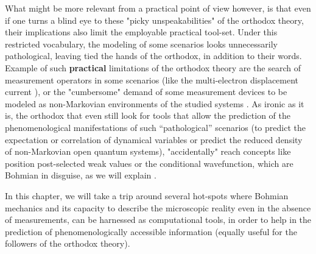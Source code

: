 \documentclass[11pt, a4paper]{article} %
\begin{document}
What might be more relevant from a practical point of view however, is that even if one turns a blind eye to these "picky unspeakabilities" of the orthodox theory, their implications also limit the employable practical tool-set. Under this restricted vocabulary, the modeling of some scenarios looks unnecessarily pathological, leaving tied the hands of the orthodox, in addition to their words. Example of such {\bf practical} limitations of the orthodox theory are the search of measurement operators in some scenarios (like the multi-electron displacement current \cite{equiv, Pel}), or the "cumbersome" demand of some measurement devices to be modeled as non-Markovian environments of the studied systems \cite{Thz}. As ironic as it is, the orthodox that even still look for tools that allow the prediction of the phenomenological manifestations of such “pathological” scenarios (to predict the expectation or correlation of dynamical variables or predict the reduced density
of non-Markovian open quantum systems),  "accidentally" reach concepts like position post-selected weak values or the conditional wavefunction, which are Bohmian in disguise, as we will explain \cite{interpretSSE,NMisModal}.\vspace{-0.1cm}

In this chapter, we will take a trip around several hot-spots where Bohmian mechanics and its capacity to describe the microscopic reality even in the absence of measurements, can be harnessed as computational tools, in order to help in the prediction of phenomenologically accessible information (equally useful for the followers of the orthodox theory). %
\end{document}
